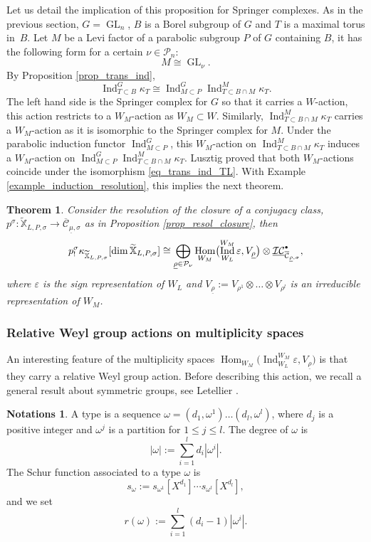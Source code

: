\documentclass[11pt]{article}
\newcommand{\sbullet}{{\scriptscriptstyle\bullet}}
\newcommand{\csbullet}{{\raisebox{1pt}{$\sbullet$}}}
\let\epsilon\varepsilon
\theoremstyle{definition}
\newtheorem{notations}[definition]{Notations}
\theoremstyle{plain}
\newtheorem{theorem}[definition]{Theorem}
\DeclareMathOperator{\Hom}{Hom}
\DeclareMathOperator{\Ind}{Ind}
\DeclareMathOperator{\GL}{GL}
\newcommand{\Part}{\mathcal{P}}
\newcommand{\uic}[1]{\underline{\mathcal{I C}}_{#1}^{\csbullet}}
\begin{document}
Let us detail the implication of this proposition for Springer complexes. As in the previous section, $G=\GL_n$, $B$ is a Borel subgroup of $G$ and $T$ is a maximal torus in~$B$. Let $M$ be a Levi factor of a parabolic subgroup $P$ of $G$ containing $B$, it has the following form for a certain $\nu\in\Part_n$:
\[
M\cong \GL_{\nu}.
\]
By Proposition \ref{prop_trans_ind},
\begin{equation}\label{eq_trans_ind_TL}
\Ind_{T\subset B}^G\kappa_{T}\cong \Ind_{M\subset P}^G\Ind_{T\subset B\cap M}^M \kappa_{T}.
\end{equation}
The left hand side is the Springer complex for $G$ so that it carries a $W$-action, this action restricts to a $W_M$-action as $W_M\subset W$. Similarly, $\Ind_{T\subset B\cap M}^M \kappa_{T}$ carries a $W_M$\nobreakdash-action as it is isomorphic to
the Springer complex for $M$. Under the parabolic induction functor $\Ind_{M\subset P}^{G}$, this $W_M$-action on $\Ind_{T\subset B\cap M}^M \kappa_{T}$ induces a $W_M$-action on $\Ind_{M\subset P}^{G}\Ind_{T\subset B\cap M}^M \kappa_{T}$. Lusztig \cite[2.5]{Lusztig1986} proved that both $W_M$-actions coincide under the isomorphism \eqref{eq_trans_ind_TL}. With Example \ref{example_induction_resolution}, this implies the next theorem.
\begin{theorem}\label{th_parabolic_induction_constant}
Consider the resolution of the closure of a conjugacy class, ${p^{\sigma}}:{\mathbb{\widetilde{X}}_{L,P,\sigma}}\to{\overline{\mathcal{C}}_{\underline{\mu},\sigma}}$ as in Proposition \ref{prop_resol_closure}, then
\[
p_!^{\sigma} \kappa_{\mathbb{\widetilde{X}}_{L,P,\sigma}}[\dim \mathbb{\widetilde{X}}_{L,P,\sigma}] \cong \bigoplus_{\underline{\rho}\in\Part_{\nu}} \Hom_{W_M} \bigl(\Ind_{W_L}^{W_M} \epsilon, V_{\underline{\rho}}\bigr)\otimes \uic{\overline{\mathcal{C}}_{\underline{\rho},\sigma}},
\]
where $\epsilon$ is the sign representation of $W_L$ and $V_{\underline{\rho}}:=V_{\rho^1}\otimes\dots\otimes V_{\rho^l}$ is an irreducible representation of $W_M$.
\end{theorem}

\subsubsection{Relative Weyl group actions on multiplicity spaces}\label{subsect_relative_weyl_class}
An interesting feature of the multiplicity spaces $\Hom_{W_M} \bigl(\Ind_{W_L}^{W_M} \epsilon, V_{\underline{\rho}}\bigr)$ is that they carry a relative Weyl group action. Before describing this action, we recall a general result about symmetric groups, see Letellier \cite[6.1, 6.2]{Letellier_gl}.
\begin{notations}
A type is a sequence $\omega=(d_1,\omega^1)\dots(d_l,\omega^l)$, where $d_j$ is a positive integer and $\omega^j$ is a partition for $1\le j \le l$. The degree of $\omega$ is
\[
|\omega|:=\sum_{i=1}^l d_i |\omega^i|.
\]
The Schur function associated to a type $\omega$ is
\[
s_{\omega}:= s_{\omega^1}[X^{d_1}]\cdots s_{\omega^l}[X^{d_l}],
\]
and we set
\begin{equation}\label{eq_r_omega}
r(\omega):= \sum_{i=1}^l (d_i-1)|\omega^i|.
\end{equation}
\end{notations}
\end{document}

